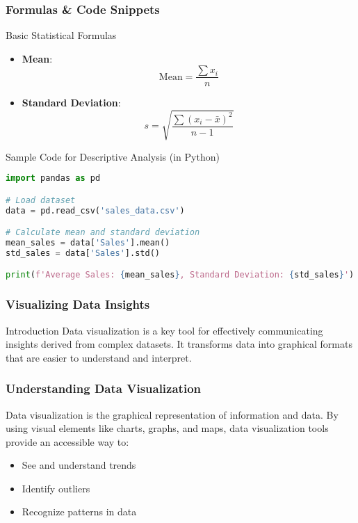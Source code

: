 \documentclass[aspectratio=169]{beamer}
\begin{document}
\begin{frame}[fragile]
    \frametitle{Formulas & Code Snippets}
    \begin{block}{Basic Statistical Formulas}
        \begin{itemize}
            \item \textbf{Mean}:
            \begin{equation}
                \text{Mean} = \frac{\sum x_i}{n}
            \end{equation}
            \item \textbf{Standard Deviation}:
            \begin{equation}
                s = \sqrt{\frac{\sum (x_i - \bar{x})^2}{n - 1}}
            \end{equation}
        \end{itemize}
    \end{block}

    \begin{block}{Sample Code for Descriptive Analysis (in Python)}
    \begin{lstlisting}[language=Python]
import pandas as pd

# Load dataset
data = pd.read_csv('sales_data.csv')

# Calculate mean and standard deviation
mean_sales = data['Sales'].mean()
std_sales = data['Sales'].std()

print(f'Average Sales: {mean_sales}, Standard Deviation: {std_sales}')
    \end{lstlisting}
    \end{block}
\end{frame}

\begin{frame}[fragile]
    \frametitle{Visualizing Data Insights}
    \begin{block}{Introduction}
        Data visualization is a key tool for effectively communicating insights derived from complex datasets. It transforms data into graphical formats that are easier to understand and interpret.
    \end{block}
\end{frame}

\begin{frame}[fragile]
    \frametitle{Understanding Data Visualization}
    Data visualization is the graphical representation of information and data. By using visual elements like charts, graphs, and maps, data visualization tools provide an accessible way to:
    \begin{itemize}
        \item See and understand trends
        \item Identify outliers
        \item Recognize patterns in data
    \end{itemize}
\end{frame}
\end{document}
